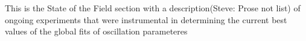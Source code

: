 This is the State of the Field section with a description(Steve: Prose not list) of ongoing experiments that were instrumental in determining the current best values of the global fits of oscillation parameteres
